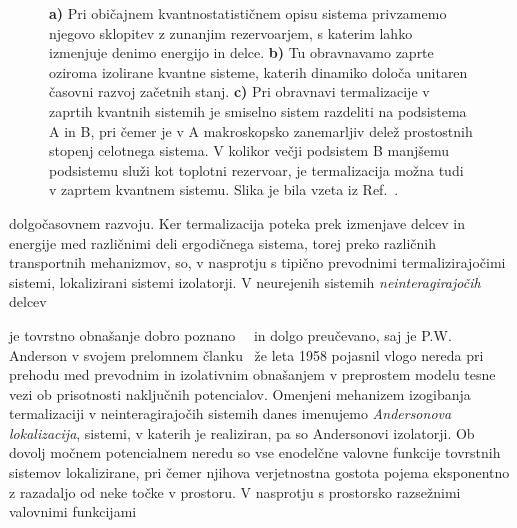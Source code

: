 \documentclass[10pt,a4paper]{article}
\begin{document}
\begin{minipage}[t]{0.55\textwidth}
\begin{figure}[H]
\caption{
\textbf{a)} Pri običajnem kvantnostatističnem opisu sistema privzamemo njegovo sklopitev z zunanjim rezervoarjem, s katerim lahko izmenjuje denimo energijo in delce. \textbf{b)} Tu obravnavamo zaprte oziroma izolirane kvantne sisteme, katerih dinamiko določa unitaren časovni razvoj začetnih stanj. \textbf{c)} Pri obravnavi termalizacije v zaprtih kvantnih sistemih je smiselno sistem razdeliti na podsistema A in B, pri čemer je v A makroskopsko zanemarljiv delež prostostnih stopenj celotnega sistema. V kolikor večji podsistem B manjšemu podsistemu služi kot toplotni rezervoar, je termalizacija možna tudi v zaprtem kvantnem sistemu. Slika je bila vzeta iz Ref.~\cite{nandkishore2015many}. 
}
\label{fig:abanin_thermalization}
\end{figure}
\end{minipage}
dolgočasovnem razvoju. Ker termalizacija poteka prek izmenjave delcev in energije med različnimi deli ergodičnega
sistema, torej preko različnih transportnih mehanizmov, so, v nasprotju s tipično prevodnimi termalizirajočimi sistemi, lokalizirani sistemi izolatorji. V neurejenih sistemih \emph{neinteragirajočih} delcev \\
\begin{minipage}[t]{0.42\textwidth}
\noindent 
je tovrstno
obnašanje dobro poznano~\cite{lagendijk2009fifty}~\cite{abrahams201050} in dolgo preučevano, saj je P.W. Anderson v svojem prelomnem članku~\cite{anderson1958absence} že leta 1958 pojasnil vlogo nereda pri prehodu med prevodnim 
in izolativnim obnašanjem v preprostem modelu tesne vezi ob prisotnosti naključnih potencialov. Omenjeni mehanizem izogibanja termalizaciji v neinteragirajočih sistemih danes imenujemo \emph{Andersonova lokalizacija}, sistemi, v katerih je realiziran, pa so Andersonovi izolatorji. Ob dovolj močnem potencialnem neredu so vse enodelčne valovne funkcije tovrstnih sistemov lokalizirane, pri čemer njihova verjetnostna gostota pojema eksponentno z razadaljo od neke točke v prostoru. V nasprotju s prostorsko razsežnimi valovnimi funkcijami 
\end{minipage}\hfill
\end{document}
